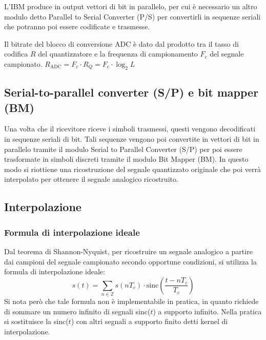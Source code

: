 L'IBM produce in output vettori di bit in parallelo, per cui è necessario un altro modulo detto Parallel to Serial
Converter (P/S) per convertirli in sequenze seriali che potranno poi essere codificate e trasmesse.

Il bitrate del blocco di conversione ADC è dato dal prodotto tra il tasso di codifica \(R\) del quantizzatore e la
frequenza di campionamento \(F_c\) del segnale campionato.
\(R_\text{ADC} = F_c \cdot R_{Q} = F_c \cdot \log_2 L\)

\subsection{Serial-to-parallel converter (S/P) e bit mapper (BM)}
Una volta che il ricevitore riceve i simboli trasmessi, questi vengono decodificati in sequenze seriali di bit. Tali
sequenze vengono poi convertite in vettori di bit in parallelo tramite il modulo Serial to Parallel Converter (S/P)
per poi essere trasformate in simboli discreti tramite il modulo Bit Mapper (BM). In questo modo si riottiene una
ricostruzione del segnale quantizzato originale che poi verrà interpolato per ottenere il segnale analogico ricostruito.

\subsection{Interpolazione}
\subsubsection*{Formula di interpolazione ideale}
Dal teorema di Shannon-Nyquist, per ricostruire un segnale analogico a partire dai campioni del segnale campionato
secondo opportune condizioni, si utilizza la formula di interpolazione ideale:
\[s(t) = \sum_{n \in \mathbb{Z}} s(n T_c) \cdot \text{sinc}\!\left(\frac{t - n T_c}{T_c}\right)\]
Si nota però che tale formula non è implementabile in pratica, in quanto richiede di sommare un numero infinito di
segnali sinc(\(t\)) a supporto infinito. Nella pratica si sostituisce la sinc(\(t\)) con altri segnali a supporto
finito detti kernel di interpolazione.

